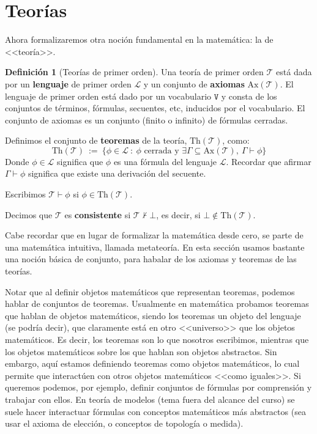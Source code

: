 \documentclass[a4paper, 12pt]{report}
\newcommand{\te}{\text}
\theoremstyle{definition}
\newtheorem{definicion}[teorema]{Definición}
\begin{document}
\section{Teorías}

Ahora formalizaremos otra noción fundamental en la matemática: la de <<teoría>>.
\begin{definicion}[Teorías de primer orden]
	Una teoría de primer orden $\mathcal{T}$ está dada por un \textbf{lenguaje} de primer orden $\mathcal{L}$ y un conjunto de \textbf{axiomas} $\te{Ax}(\mathcal{T})$. El lenguaje de primer orden está dado por un vocabulario $\mathtt{V}$ y consta de los conjuntos de términos, fórmulas, secuentes, etc, inducidos por el vocabulario. El conjunto de axiomas es un conjunto (finito o infinito) de fórmulas cerradas.
	
	Definimos el conjunto de \textbf{teoremas} de la teoría, $\te{Th}(\mathcal{T})$, como:
	$$ \te{Th}(\mathcal{T})~:=~\{\phi\in\mathcal{L}~:~\phi\te{ cerrada y }\exists\Gamma\subseteq \te{Ax}(\mathcal{T}),~\Gamma\vdash\phi\}
	$$
	Donde $\phi\in\mathcal{L}$ significa que $\phi$ es una fórmula del lenguaje $\mathcal{L}$. Recordar que afirmar $\Gamma\vdash\phi$ significa que existe una derivación del secuente.
	
	Escribimos $\mathcal{T}\vdash\phi$ si $\phi\in \te{Th}(\mathcal{T})$.
	
	Decimos que $\mathcal{T}$ es \textbf{consistente} si $\mathcal{T}\not\vdash\bot$, es decir, si $\bot\not\in\te{Th}(\mathcal{T})$.
\end{definicion}
Cabe recordar que en lugar de formalizar la matemática desde cero, se parte de una matemática intuitiva, llamada metateoría. En esta sección usamos bastante una noción básica de conjunto, para habalar de los axiomas y teoremas de las teorías.

Notar que al definir objetos matemáticos que representan teoremas, podemos hablar de conjuntos de teoremas. Usualmente en matemática probamos teoremas que hablan de objetos matemáticos, siendo los teoremas un objeto del lenguaje (se podría decir), que claramente está en otro <<universo>> que los objetos matemáticos. Es decir, los teoremas son lo que nosotros escribimos, mientras que los objetos matemáticos sobre los que hablan son objetos abstractos. Sin embargo, aquí estamos definiendo teoremas como objetos matemáticos, lo cual permite que interactúen con otros objetos matemáticos <<como iguales>>. Si queremos podemos, por ejemplo, definir conjuntos de fórmulas por comprensión y trabajar con ellos. En teoría de modelos (tema fuera del alcance del curso) se suele hacer interactuar fórmulas con conceptos matemáticos más abstractos (sea usar el axioma de elección, o conceptos de topología o medida).
\end{document}
